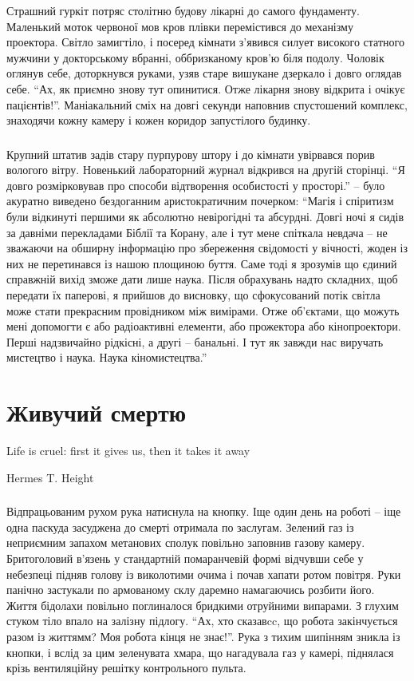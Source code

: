 \documentclass[a4paper,oneside]{book}
\begin{document}
Страшний гуркіт потряс столітню будову лікарні до самого фундаменту. Маленький
моток червоної мов кров плівки перемістився до механізму проектора. Світло
замигтіло, і посеред кімнати з’явився силует високого статного мужчини у
докторському вбранні, оббризканому кров’ю біля подолу. Чоловік оглянув себе,
доторкнувся руками, узяв старе вишукане дзеркало і довго оглядав себе. “Ах, як
приємно знову тут опинитися. Отже лікарня знову відкрита і очікує
пацієнтів!”. Маніакальний сміх на довгі секунди наповнив спустошений комплекс,
знаходячи кожну камеру і кожен коридор запустілого будинку.

\section*{}
 
Крупний штатив задів стару пурпурову штору і до кімнати увірвався порив
вологого вітру. Новенький лабораторний журнал відкрився на другій сторінці. “Я
довго розмірковував про способи відтворення особистості у просторі.” – було
акуратно виведено бездоганним аристократичним почерком: “Магія і спіритизм
були відкинуті першими як абсолютно невірогідні та абсурдні. Довгі ночі я
сидів за давніми перекладами Біблії та Корану, але і тут мене спіткала невдача
– не зважаючи на обширну інформацію про збереження свідомості у вічності,
жоден із них не перетинався із нашою площиною буття. Саме тоді я зрозумів що
єдиний справжній вихід зможе дати лише наука. Після обрахувань надто складних,
щоб передати їх паперові, я прийшов до висновку, що сфокусований потік світла
може стати прекрасним провідником між вимірами. Отже об’єктами, що можуть мені
допомогти є або радіоактивні елементи, або прожектора або кінопроектори. Перші
надзвичайно рідкісні, а другі – банальні. І тут як завжди нас виручать
мистецтво і наука. Наука кіномистецтва.”

\part{Живучий смертю}
\setcounter{chapter}{2}

\epigraph{Life is cruel: first it gives us, then it takes it away}{Hermes T. Height}

\section*{}

Відпрацьованим рухом рука натиснула на кнопку. Іще один день на роботі – іще
одна паскуда засуджена до смерті отримала по заслугам. Зелений газ із
неприємним запахом метанових сполук повільно заповнив газову
камеру. Бритоголовий в’язень у стандартній помаранчевій формі відчувши себе у
небезпеці підняв голову із виколотими очима і почав хапати ротом повітря. Руки
панічно застукали по армованому склу даремно намагаючись розбити його. Життя
бідолахи повільно поглиналося бридкими отруйними випарами. З глухим стуком
тіло впало на залізну підлогу. “Ах, хто сказавcc, що робота закінчується разом
із життямм? Моя робота кінця не знає!”. Рука з тихим шипінням зникла із
кнопки, і вслід за цим зеленувата хмара, що нагадувала газ у камері, піднялася
крізь вентиляційну решітку контрольного пульта. 
\end{document}
